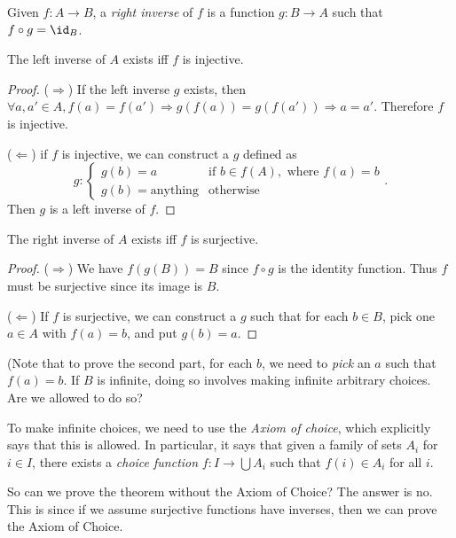 \documentclass[a4paper]{article}
\begin{document}
\begin{defi}
  Given $f: A\to B$, a \emph{right inverse} of $f$ is a function $g:B\to A$ such that $f\circ g = \id _B$.
\end{defi}

\begin{thm}
  The left inverse of $A$ exists iff $f$ is injective.
\end{thm}

\begin{proof}
  ($\Rightarrow$)
  If the left inverse $g$ exists, then $\forall a, a'\in A, f(a) = f(a') \Rightarrow g(  f(a))=g(f(a'))\Rightarrow a=a'$. Therefore $f$ is injective.

  ($\Leftarrow$) if $f$ is injective, we can construct a $g$ defined as
  \[
    g: \begin{cases}
      g(b) = a &\text{if }b\in f(A), \text{ where }f(a) = b\\
      g(b) = \text{anything} & \text{otherwise}
    \end{cases}.
  \]
  Then $g$ is a left inverse of $f$.
\end{proof}

\begin{thm}
  The right inverse of $A$ exists iff $f$ is surjective.
\end{thm}

\begin{proof}
  ($\Rightarrow$) We have $f(g(B)) = B$ since $f\circ g$ is the identity function. Thus $f$ must be surjective since its image is $B$.

  ($\Leftarrow$) If $f$ is surjective, we can construct a $g$ such that for each $b\in B$, pick one $a\in A$ with $f(a) = b$, and put $g(b) = a$.
\end{proof}

(Note that to prove the second part, for each $b$, we need to \emph{pick} an $a$ such that $f(a) = b$. If $B$ is infinite, doing so involves making infinite arbitrary choices. Are we allowed to do so?

To make infinite choices, we need to use the \emph{Axiom of choice}, which explicitly says that this is allowed. In particular, it says that given a family of sets $A_i$ for $i \in I$, there exists a \emph{choice function} $f: I \to \bigcup A_i$ such that $f(i)\in A_i$ for all $i$.

So can we prove the theorem without the Axiom of Choice? The answer is no. This is since if we assume surjective functions have inverses, then we can prove the Axiom of Choice.
\end{document}
